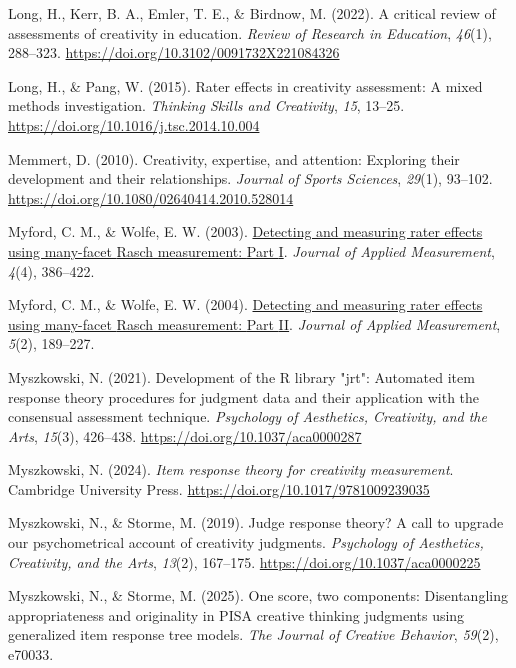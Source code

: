 \documentclass[
  12pt,
]{article}
\newlength{\cslhangindent}
\newenvironment{CSLReferences}[2] %
 {\begin{list}{}{%
  \setlength{\itemindent}{0pt}
  \setlength{\leftmargin}{0pt}
  \setlength{\parsep}{0pt}
  \ifodd #1
   \setlength{\leftmargin}{\cslhangindent}
   \setlength{\itemindent}{-1\cslhangindent}
  \fi
  \setlength{\itemsep}{#2\baselineskip}}}
 {\end{list}}
\begin{document}
\begin{CSLReferences}{1}{0}
Long, H., Kerr, B. A., Emler, T. E., \& Birdnow, M. (2022). A critical
review of assessments of creativity in education. \emph{Review of
Research in Education}, \emph{46}(1), 288--323.
\url{https://doi.org/10.3102/0091732X221084326}

Long, H., \& Pang, W. (2015). Rater effects in creativity assessment: A
mixed methods investigation. \emph{Thinking Skills and Creativity},
\emph{15}, 13--25. \url{https://doi.org/10.1016/j.tsc.2014.10.004}

Memmert, D. (2010). Creativity, expertise, and attention: Exploring
their development and their relationships. \emph{Journal of Sports
Sciences}, \emph{29}(1), 93--102.
\url{https://doi.org/10.1080/02640414.2010.528014}

Myford, C. M., \& Wolfe, E. W. (2003).
\href{https://www.ncbi.nlm.nih.gov/pubmed/14523257}{Detecting and
measuring rater effects using many-facet {Rasch} measurement: {P}art
{I}}. \emph{Journal of Applied Measurement}, \emph{4}(4), 386--422.

Myford, C. M., \& Wolfe, E. W. (2004).
\href{https://www.ncbi.nlm.nih.gov/pubmed/15064538}{Detecting and
measuring rater effects using many-facet {Rasch} measurement: {P}art
{II}}. \emph{Journal of Applied Measurement}, \emph{5}(2), 189--227.

Myszkowski, N. (2021). Development of the {R} library "jrt": Automated
item response theory procedures for judgment data and their application
with the consensual assessment technique. \emph{Psychology of
Aesthetics, Creativity, and the Arts}, \emph{15}(3), 426--438.
\url{https://doi.org/10.1037/aca0000287}

Myszkowski, N. (2024). \emph{Item response theory for creativity
measurement}. Cambridge University Press.
\url{https://doi.org/10.1017/9781009239035}

Myszkowski, N., \& Storme, M. (2019). Judge response theory? A call to
upgrade our psychometrical account of creativity judgments.
\emph{Psychology of Aesthetics, Creativity, and the Arts}, \emph{13}(2),
167--175. \url{https://doi.org/10.1037/aca0000225}

Myszkowski, N., \& Storme, M. (2025). One score, two components:
Disentangling appropriateness and originality in {PISA} creative
thinking judgments using generalized item response tree models.
\emph{The Journal of Creative Behavior}, \emph{59}(2), e70033.


\end{CSLReferences}
\end{document}
